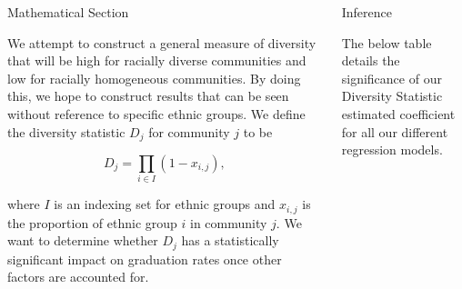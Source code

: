 \documentclass[final]{beamer}
\newlength{\onecolwid}
\newlength{\twocolwid}
\begin{document}
\begin{frame}[t]
\begin{columns}[t]
\begin{column}{\twocolwid}
\begin{columns}[t,totalwidth=\twocolwid]
\begin{column}{\onecolwid}
\begin{block}{Mathematical Section}

We attempt to construct a general measure of diversity that will be high for racially diverse communities and low for racially homogeneous communities.  By doing this, we hope to construct results that can be seen without reference to specific ethnic groups.  We define the diversity statistic $D_j$ for community $j$ to be

\begin{equation}
 D_j = \prod_{i \in I}(1-x_{i,j}),
\label{eqn:Diversity Statistic}
\end{equation}

where $I$ is an indexing set for ethnic groups and $x_{i,j}$ is the proportion of ethnic group $i$ in community $j$.  We want to determine whether $D_j$ has a statistically significant impact on graduation rates once other factors are accounted for.  

\end{block}


\end{column} %

\begin{column}{\onecolwid} %


\begin{block}{Inference}

The below table details the significance of our Diversity Statistic estimated coefficient for all our different regression models.


\end{block}
\end{column}
\end{columns}
\end{column}
\end{columns}
\end{frame}
\end{document}
